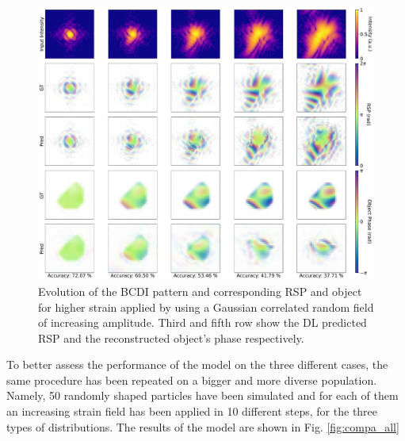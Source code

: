 \begin{figure}[H]
    \centering
    \includegraphics[width=\textwidth]{figures/Phasing/performance_random.pdf}
    \caption{Evolution of the BCDI pattern and corresponding RSP and object for higher strain applied by using a Gaussian
    correlated random field of increasing amplitude. Third and fifth row show the DL predicted RSP and the reconstructed 
    object's phase respectively. }
    \label{fig:random1}
\end{figure}

To better assess the performance of the model on the three different cases, the same procedure has been repeated on a 
bigger and more diverse population. Namely, 50 randomly shaped particles have been simulated and for each of them an 
increasing strain field has been applied in 10 different steps, for the three types of distributions. The results of 
the model are shown in Fig. \ref{fig:compa_all}

